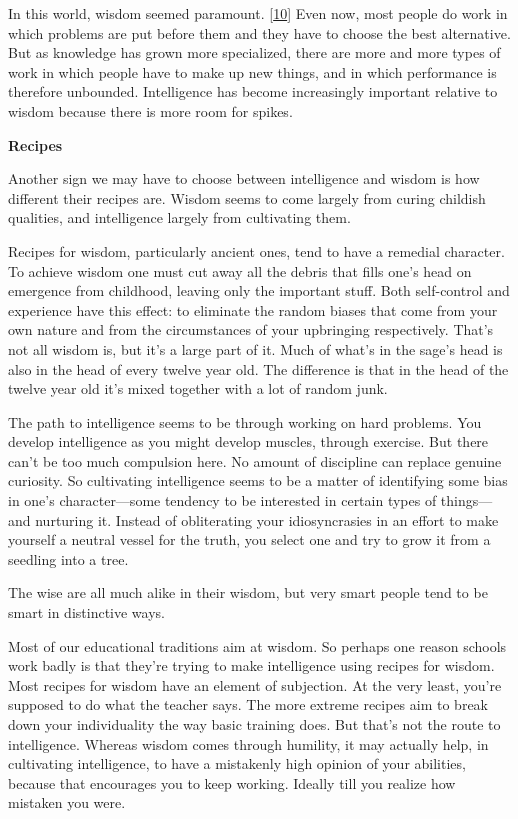 In this world, wisdom seemed paramount. {[}\hyperref[f10n]{10}{]} Even
now, most people do work in which problems are put before them and they
have to choose the best alternative. But as knowledge has grown more
specialized, there are more and more types of work in which people have
to make up new things, and in which performance is therefore unbounded.
Intelligence has become increasingly important relative to wisdom
because there is more room for spikes.

\textbf{Recipes}

Another sign we may have to choose between intelligence and wisdom is
how different their recipes are. Wisdom seems to come largely from
curing childish qualities, and intelligence largely from cultivating
them.

Recipes for wisdom, particularly ancient ones, tend to have a remedial
character. To achieve wisdom one must cut away all the debris that fills
one's head on emergence from childhood, leaving only the important
stuff. Both self-control and experience have this effect: to eliminate
the random biases that come from your own nature and from the
circumstances of your upbringing respectively. That's not all wisdom is,
but it's a large part of it. Much of what's in the sage's head is also
in the head of every twelve year old. The difference is that in the head
of the twelve year old it's mixed together with a lot of random junk.

The path to intelligence seems to be through working on hard problems.
You develop intelligence as you might develop muscles, through exercise.
But there can't be too much compulsion here. No amount of discipline can
replace genuine curiosity. So cultivating intelligence seems to be a
matter of identifying some bias in one's character---some tendency to be
interested in certain types of things---and nurturing it. Instead of
obliterating your idiosyncrasies in an effort to make yourself a neutral
vessel for the truth, you select one and try to grow it from a seedling
into a tree.

The wise are all much alike in their wisdom, but very smart people tend
to be smart in distinctive ways.

Most of our educational traditions aim at wisdom. So perhaps one reason
schools work badly is that they're trying to make intelligence using
recipes for wisdom. Most recipes for wisdom have an element of
subjection. At the very least, you're supposed to do what the teacher
says. The more extreme recipes aim to break down your individuality the
way basic training does. But that's not the route to intelligence.
Whereas wisdom comes through humility, it may actually help, in
cultivating intelligence, to have a mistakenly high opinion of your
abilities, because that encourages you to keep working. Ideally till you
realize how mistaken you were.

